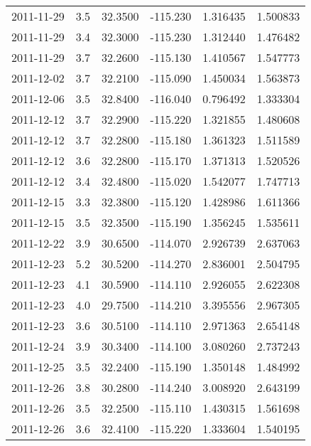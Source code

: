 \begin{tabular}{lrrrrr}
2011-11-29 &       3.5 &  32.3500 &  -115.230 &         1.316435 &         1.500833 \\
2011-11-29 &       3.4 &  32.3000 &  -115.230 &         1.312440 &         1.476482 \\
2011-11-29 &       3.7 &  32.2600 &  -115.130 &         1.410567 &         1.547773 \\
2011-12-02 &       3.7 &  32.2100 &  -115.090 &         1.450034 &         1.563873 \\
2011-12-06 &       3.5 &  32.8400 &  -116.040 &         0.796492 &         1.333304 \\
2011-12-12 &       3.7 &  32.2900 &  -115.220 &         1.321855 &         1.480608 \\
2011-12-12 &       3.7 &  32.2800 &  -115.180 &         1.361323 &         1.511589 \\
2011-12-12 &       3.6 &  32.2800 &  -115.170 &         1.371313 &         1.520526 \\
2011-12-12 &       3.4 &  32.4800 &  -115.020 &         1.542077 &         1.747713 \\
2011-12-15 &       3.3 &  32.3800 &  -115.120 &         1.428986 &         1.611366 \\
2011-12-15 &       3.5 &  32.3500 &  -115.190 &         1.356245 &         1.535611 \\
2011-12-22 &       3.9 &  30.6500 &  -114.070 &         2.926739 &         2.637063 \\
2011-12-23 &       5.2 &  30.5200 &  -114.270 &         2.836001 &         2.504795 \\
2011-12-23 &       4.1 &  30.5900 &  -114.110 &         2.926055 &         2.622308 \\
2011-12-23 &       4.0 &  29.7500 &  -114.210 &         3.395556 &         2.967305 \\
2011-12-23 &       3.6 &  30.5100 &  -114.110 &         2.971363 &         2.654148 \\
2011-12-24 &       3.9 &  30.3400 &  -114.100 &         3.080260 &         2.737243 \\
2011-12-25 &       3.5 &  32.2400 &  -115.190 &         1.350148 &         1.484992 \\
2011-12-26 &       3.8 &  30.2800 &  -114.240 &         3.008920 &         2.643199 \\
2011-12-26 &       3.5 &  32.2500 &  -115.110 &         1.430315 &         1.561698 \\
2011-12-26 &       3.6 &  32.4100 &  -115.220 &         1.333604 &         1.540195 \\

\end{tabular}
